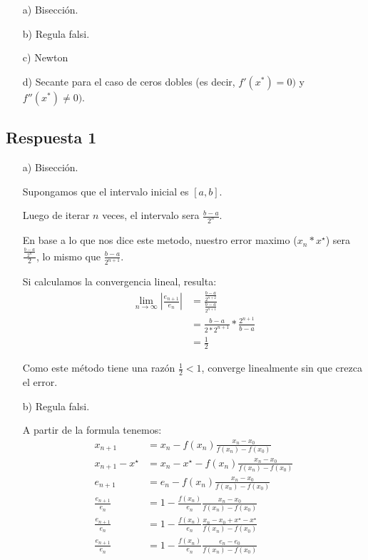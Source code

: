 \documentclass[spanish, fleqn]{article}
\newcommand{\xstar}{x^\star}
\begin{document}
\begin{enumerate}
    \item[a)] Bisección.
    \item[b)] Regula falsi.
    \item[c)] Newton
    \item[d)] Secante para el caso de ceros dobles (es decir, $f'(x^*) = 0)$ y $f''(x^*)\neq 0)$.
\end{enumerate}

\subsection{Respuesta 1}

\begin{enumerate}
    \item[a)] Bisección.
    
    Supongamos que el intervalo inicial es $[a, b]$. 
    
    Luego de iterar $n$ veces, el intervalo sera $\frac{b-a}{2^n}$. 
    
    En base a lo que nos dice este metodo, nuestro error maximo ($x_n * x^\star$) sera $\frac{\frac{b-a}{2^n}}{2}$, lo mismo que $\frac{b-a}{2^{n+1}}$.
    
    Si calculamos la convergencia lineal, resulta:
    \begin{align*}
        \lim_{n\rightarrow\infty} \left| \frac{e_{n+1}}{e_n} \right| &= \frac{\frac{b-a}{2^{n+2}}}{\frac{b-a}{2^{n+1}}} \\ 
        &= \frac{b-a}{2*2^{n+1}} * \frac{2^{n+1}}{b-a} \\ 
        &= \frac{1}{2}
    \end{align*}
    
    Como este método tiene una razón $\frac{1}{2} < 1$, converge linealmente sin que crezca el error.
    
    
    \item[b)] Regula falsi.
    
    A partir de la formula tenemos:
    \begin{align*}
        x_{n+1} &= x_n - f(x_n)\frac{x_n - x_0}{f(x_n) - f(x_0)} \\
        x_{n+1} - \xstar &= x_n - \xstar - f(x_n)\frac{x_n - x_0}{f(x_n) - f(x_0)} \\
        e_{n+1} &= e_n - f(x_n)\frac{x_n - x_0}{f(x_n) - f(x_0)} \\
        \frac{e_{n+1}}{e_n} &= 1 - \frac{f(x_n)}{e_n}\frac{x_n - x_0}{f(x_n) - f(x_0)} \\
        \frac{e_{n+1}}{e_n} &= 1 - \frac{f(x_n)}{e_n}\frac{x_n - x_0 + \xstar - \xstar }{f(x_n) - f(x_0)} \\
        \frac{e_{n+1}}{e_n} &= 1 - \frac{f(x_n)}{e_n}\frac{e_n - e_0}{f(x_n) - f(x_0)}
    \end{align*}
    

\end{enumerate}
\end{document}
